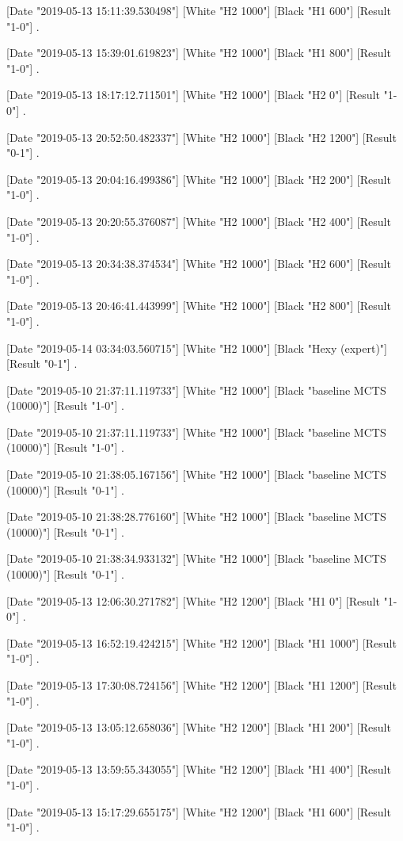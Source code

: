 {[Date "2019-05-13 15:11:39.530498"]
[White "H2 1000"]
[Black "H1 600"]
[Result "1-0"]
.

[Date "2019-05-13 15:39:01.619823"]
[White "H2 1000"]
[Black "H1 800"]
[Result "1-0"]
.

[Date "2019-05-13 18:17:12.711501"]
[White "H2 1000"]
[Black "H2 0"]
[Result "1-0"]
.

[Date "2019-05-13 20:52:50.482337"]
[White "H2 1000"]
[Black "H2 1200"]
[Result "0-1"]
.

[Date "2019-05-13 20:04:16.499386"]
[White "H2 1000"]
[Black "H2 200"]
[Result "1-0"]
.

[Date "2019-05-13 20:20:55.376087"]
[White "H2 1000"]
[Black "H2 400"]
[Result "1-0"]
.

[Date "2019-05-13 20:34:38.374534"]
[White "H2 1000"]
[Black "H2 600"]
[Result "1-0"]
.

[Date "2019-05-13 20:46:41.443999"]
[White "H2 1000"]
[Black "H2 800"]
[Result "1-0"]
.

[Date "2019-05-14 03:34:03.560715"]
[White "H2 1000"]
[Black "Hexy (expert)"]
[Result "0-1"]
.

[Date "2019-05-10 21:37:11.119733"]
[White "H2 1000"]
[Black "baseline MCTS (10000)"]
[Result "1-0"]
.

[Date "2019-05-10 21:37:11.119733"]
[White "H2 1000"]
[Black "baseline MCTS (10000)"]
[Result "1-0"]
.

[Date "2019-05-10 21:38:05.167156"]
[White "H2 1000"]
[Black "baseline MCTS (10000)"]
[Result "0-1"]
.

[Date "2019-05-10 21:38:28.776160"]
[White "H2 1000"]
[Black "baseline MCTS (10000)"]
[Result "0-1"]
.

[Date "2019-05-10 21:38:34.933132"]
[White "H2 1000"]
[Black "baseline MCTS (10000)"]
[Result "0-1"]
.

[Date "2019-05-13 12:06:30.271782"]
[White "H2 1200"]
[Black "H1 0"]
[Result "1-0"]
.

[Date "2019-05-13 16:52:19.424215"]
[White "H2 1200"]
[Black "H1 1000"]
[Result "1-0"]
.

[Date "2019-05-13 17:30:08.724156"]
[White "H2 1200"]
[Black "H1 1200"]
[Result "1-0"]
.

[Date "2019-05-13 13:05:12.658036"]
[White "H2 1200"]
[Black "H1 200"]
[Result "1-0"]
.

[Date "2019-05-13 13:59:55.343055"]
[White "H2 1200"]
[Black "H1 400"]
[Result "1-0"]
.

[Date "2019-05-13 15:17:29.655175"]
[White "H2 1200"]
[Black "H1 600"]
[Result "1-0"]
.

}
